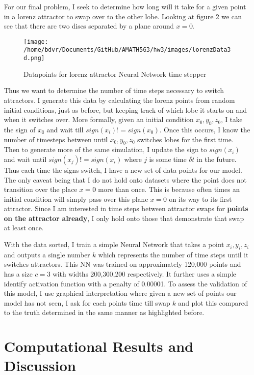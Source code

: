 \documentclass[12pt]{article}
\begin{document}
\par 
For our final problem, I seek to determine how long will it take for a given point in a lorenz attractor to swap over to the other lobe. Looking at figure 2 we can see that there are two discs separated by a plane around $x=0$. 
\begin{wrapfigure}{l}{3in}
	\texttt{[image: /home/bdvr/Documents/GitHub/AMATH563/hw3/images/lorenzData3d.png]}
	\caption{Datapoints for lorenz attractor Neural Network time stepper}
\end{wrapfigure}
Thus we want to determine the number of time steps necessary to switch attractors. I generate this data by calculating the lorenz points from random initial conditions, just as before, but keeping track of which lobe it starts on and when it switches over. More formally, given an initial condition $x_0,y_0,z_0$, I take the sign of $x_0$ and wait till $sign(x_i)!=sign(x_0)$. Once this occurs, I know the number of timesteps between until $x_0,y_0,z_0$  switches lobes for the first time. Then to generate more of the same simulation, I update the sign to $sign(x_i)$ and wait until $sign(x_j)!=sign(x_i)$ where $j$ is some time $\delta t$ in the future. Thus each time the signs switch, I have a new set of data points for our model. The only caveat being that I do not hold onto datasets where the point does not transition over the place $x=0$ more than once. This is because often times an initial condition will simply pass over this plane $x=0$ on its way to its first attractor. Since I am interested in time steps between attractor swaps for \textbf{points on the attractor already}, I only hold onto those that demonstrate that swap at least once.
\par 
With the data sorted, I train a simple Neural Network that takes a point $x_i,y_i,z_i$ and outputs a single number $k$ which represents the number of time steps until it switches attractors. This NN was trained on approximately 120,000 points and has a size $c=3$ with widths 200,300,200 respectively. It further uses a simple identify activation function with a penalty of 0.00001. To assess the validation of this model, I use graphical interpretation where given a new set of points our model has not seen, I ask for each points time till swap $k$ and plot this compared to the truth determined in the same manner as highlighted before.

\section[Look what i made]{Computational Results and Discussion}
\end{document}
